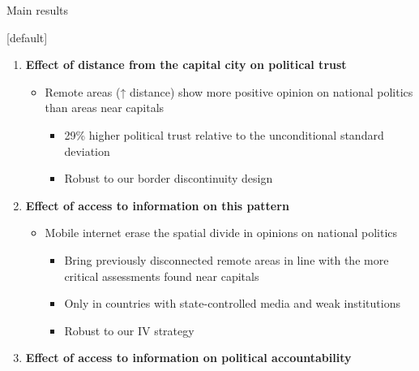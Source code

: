 \documentclass[10pt]{beamer}
\begin{document}
\begin{frame}{Main results}

    [default]
    \begin{enumerate}\setlength\itemsep{0.5em}
        \item \textcolor{rougeprez}{\textbf{Effect of distance from the capital city on political trust}}\\
        \begin{itemize}\setlength\itemsep{1em}

            \item Remote areas (↑ distance) show more positive opinion on national politics than areas near capitals
            \begin{itemize}\setlength\itemsep{1em}

                \item 29\% higher political trust relative to the unconditional standard deviation
                \item Robust to our border discontinuity design  
            \end{itemize}
        \end{itemize}
        \item \textcolor{rougeprez}{\textbf{Effect of access to information on this pattern}}\\
        \begin{itemize}\setlength\itemsep{1em}

            \item Mobile internet erase the spatial divide in opinions on national politics
            \begin{itemize}\setlength\itemsep{1em}

                \item Bring previously disconnected remote areas in line with the more critical assessments found near capitals
                \item Only in countries with state-controlled media and weak institutions
                \item Robust to our IV strategy  
            \end{itemize}
        \end{itemize}
        \item \textcolor{rougeprez}{\textbf{Effect of access to information on political accountability}}\\
            \begin{itemize}\setlength\itemsep{1em}


\end{itemize}
\end{enumerate}
\end{frame}
\end{document}
